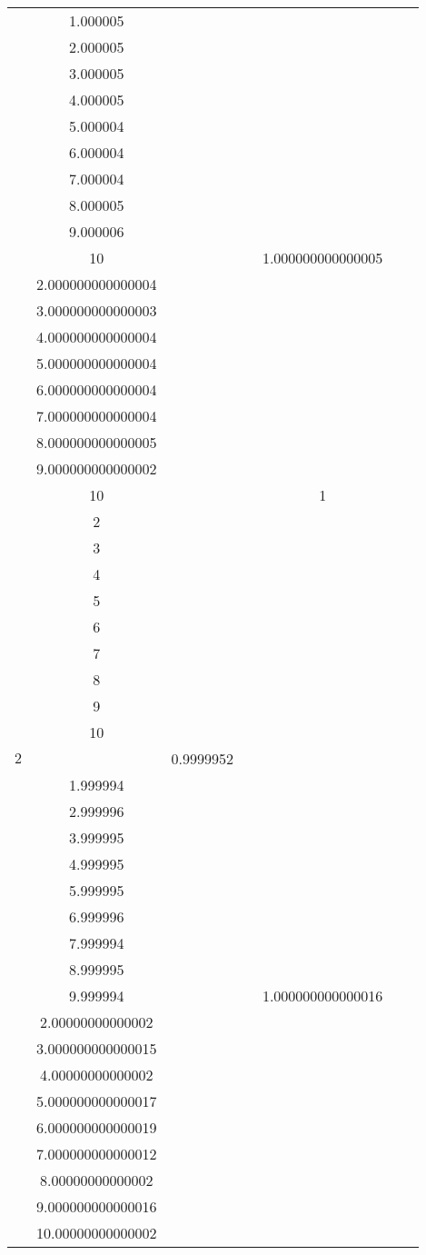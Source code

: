 \documentclass[oneside, final, 12pt]{extarticle}
\begin{document}
\begin{longtable}{|c|c|c|c|c|c|c|}
\begin{aligned}
& 1.000005 \\ & 2.000005 \\ & 3.000005 \\ & 4.000005 \\ & 5.000004 \\ & 6.000004 \\ & 7.000004 \\ & 8.000005 \\ & 9.000006 \\ & 10 
\end{aligned} \)
& ~ 
& \( \begin{aligned}
& 1.000000000000005 \\ & 2.000000000000004 \\ & 3.000000000000003 \\ & 4.000000000000004 \\ & 5.000000000000004 \\ & 6.000000000000004 \\ & 7.000000000000004 \\ & 8.000000000000005 \\ & 9.000000000000002 \\ & 10 
\end{aligned} \)
& ~ 
& \( \begin{aligned}
& 1 \\ & 2 \\ & 3 \\ & 4 \\ & 5 \\ & 6 \\ & 7 \\ & 8 \\ & 9 \\ & 10 
\end{aligned} \)
& ~ 
\\ \hline
\(2\) & \( \begin{aligned}
& 0.9999952 \\ & 1.999994 \\ & 2.999996 \\ & 3.999995 \\ & 4.999995 \\ & 5.999995 \\ & 6.999996 \\ & 7.999994 \\ & 8.999995 \\ & 9.999994 
\end{aligned} \)
& ~ 
& \( \begin{aligned}
& 1.000000000000016 \\ & 2.00000000000002 \\ & 3.000000000000015 \\ & 4.00000000000002 \\ & 5.000000000000017 \\ & 6.000000000000019 \\ & 7.000000000000012 \\ & 8.00000000000002 \\ & 9.000000000000016 \\ & 10.00000000000002 

\end{aligned}
\end{longtable}
\end{document}

